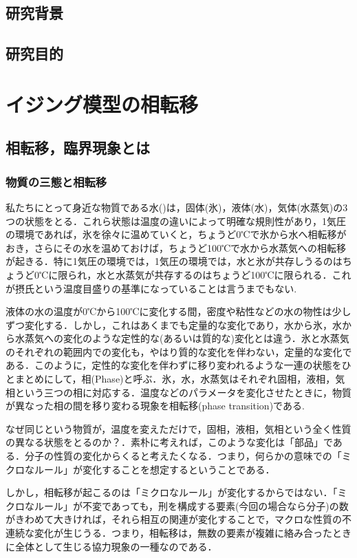 \documentclass[a4paper,11pt]{jsreport}
\begin{document}
\section{研究背景}
\section{研究目的}


\chapter{イジング模型の相転移}
\section{相転移，臨界現象とは}
\subsection{物質の三態と相転移}
私たちにとって身近な物質である水()は，固体(氷)，液体(水)，気体(水蒸気)の3つの状態をとる．これら状態は温度の違いによって明確な規則性があり，1気圧の環境であれば，氷を徐々に温めていくと，ちょうど0℃で氷から水へ相転移がおき，さらにその水を温めておけば，ちょうど100℃で水から水蒸気への相転移が起きる．特に1気圧の環境では，1気圧の環境では，水と氷が共存しうるのはちょうど0℃に限られ，水と水蒸気が共存するのはちょうど100℃に限られる．これが摂氏という温度目盛りの基準になっていることは言うまでもない.\par
液体の水の温度が0℃から100℃に変化する間，密度や粘性などの水の物性は少しずつ変化する．しかし，これはあくまでも定量的な変化であり，水から氷，水から水蒸気への変化のような定性的な(あるいは質的な)変化とは違う．氷と水蒸気のそれぞれの範囲内での変化も，やはり質的な変化を伴わない，定量的な変化である．このように，定性的な変化を伴わずに移り変われるような一連の状態をひとまとめにして，相(Phase)と呼ぶ．氷，水，水蒸気はそれぞれ固相，液相，気相という三つの相に対応する．温度などのパラメータを変化させたときに，物質が異なった相の間を移り変わる現象を相転移(phase transition)である.\par
なぜ同じという物質が，温度を変えただけで，固相，液相，気相という全く性質の異なる状態をとるのか？．素朴に考えれば，このような変化は「部品」である．分子の性質の変化からくると考えたくなる．つまり，何らかの意味での「ミクロなルール」が変化することを想定するということである．\par
しかし，相転移が起こるのは「ミクロなルール」が変化するからではない．「ミクロなルール」が不変であっても，刑を構成する要素(今回の場合なら分子)の数がきわめて大きければ，それら相互の関連が変化することで，マクロな性質の不連続な変化が生じうる．つまり，相転移は，無数の要素が複雑に絡み合ったときに全体として生じる協力現象の一種なのである．
\end{document}
